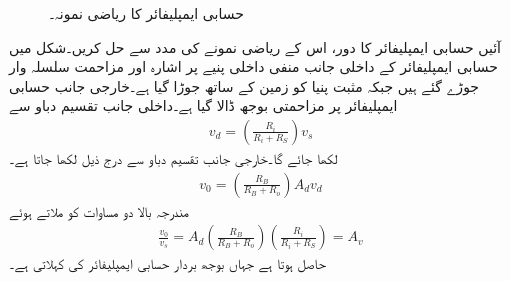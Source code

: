 \begin{figure}
\centering
{}
\caption{حسابی ایمپلیفائر کا ریاضی نمونہ۔}
\label{شکل_حسابی_نمونہ}
\end{figure}    
آئیں حسابی ایمپلیفائر کا دور، اس کے ریاضی نمونے کی مدد سے حل کریں۔شکل  میں حسابی ایمپلیفائر کے داخلی جانب منفی داخلی پنیے پر  اشارہ  اور مزاحمت  سلسلہ وار جوڑے گئے ہیں جبکہ مثبت پنیا کو زمین کے ساتھ جوڑا گیا ہے۔خارجی جانب حسابی ایمپلیفائر پر مزاحمتی بوجھ  ڈالا گیا ہے۔داخلی جانب تقسیم دباو سے
\begin{align*}
v_d=\left(\frac{R_i}{R_i+R_S}\right)v_s
\end{align*}
لکھا جائے گا۔خارجی جانب تقسیم دباو سے درج ذیل لکھا جاتا ہے۔
\begin{align*}
v_0=\left(\frac{R_B}{R_B+R_o}\right) A_d v_d
\end{align*}
 مندرجہ بالا دو مساوات کو ملاتے ہوئے
\begin{align}\label{مساوات_حسابی_افزائش_الف}
\frac{v_0}{v_s}= A_d \left(\frac{R_B}{R_B+R_o}\right)\left(\frac{R_i}{R_i+R_S}\right)=A_v
\end{align}
حاصل ہوتا ہے جہاں  بوجھ بردار حسابی ایمپلیفائر کی  کہلاتی ہے۔ 
